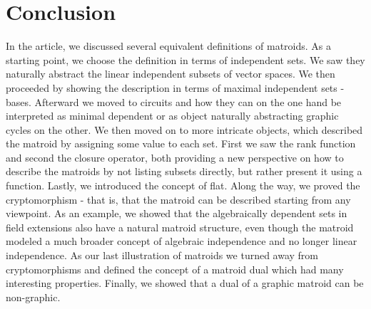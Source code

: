 \section{Conclusion}
In the article, we discussed several equivalent definitions of matroids. As a starting point, we choose the definition in terms of independent sets. We saw they naturally abstract the linear independent subsets of vector spaces. We then proceeded by showing the description in terms of maximal independent sets - bases. Afterward we moved to circuits and how they can on the one hand be interpreted as minimal dependent or as object naturally abstracting graphic cycles on the other. We then moved on to more intricate objects, which described the matroid by assigning some value to each set. First we saw the rank function and second the closure operator, both providing a new perspective on how to describe the matroids by not listing subsets directly, but rather present it using a function. Lastly, we introduced the concept of flat. Along the way, we proved the cryptomorphism - that is, that the matroid can be described starting from any viewpoint. As an example, we showed that the algebraically dependent sets in field extensions also have a natural matroid structure, even though the matroid modeled a much broader concept of algebraic independence and no longer linear independence. As our last illustration of matroids we turned away from cryptomorphisms and defined the concept of a matroid dual which had many interesting properties. Finally, we showed that a dual of a graphic matroid can be non-graphic.
